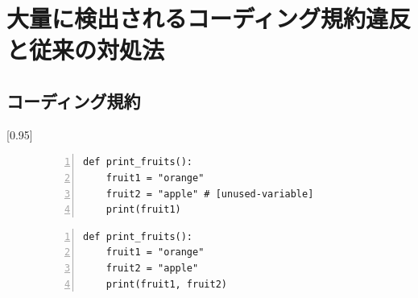 \documentclass[T,J]{fose} %
\begin{document}

\section{大量に検出されるコーディング規約違反と従来の対処法}\label{sec:background}

\subsection{コーディング規約}

\scalebox{0.95}[0.95] {

}
\begin{figure}[t]
\small
\vspace{-16pt}
    \begin{lstlisting}[caption={[upper/lower text]%
               \begin{tabular}[t]{@{}l@{}}
                problematic.py \\[1.0\normalbaselineskip]
               \end{tabular}},frame={tb},numbers=left,label=problematic,identifierstyle={\small}]
def print_fruits():
    fruit1 = "orange"
    fruit2 = "apple" # [unused-variable]
    print(fruit1)
\end{lstlisting}
\vspace{-13mm}
\end{figure}

\begin{figure}[t]
\small
    \begin{lstlisting}[caption={[upper/lower text]%
               \begin{tabular}[t]{@{}l@{}}
                correct.py \\[1.0\normalbaselineskip]
               \end{tabular}},frame={tb},numbers=left,label=correct,identifierstyle={\small}]
def print_fruits():
    fruit1 = "orange"
    fruit2 = "apple"
    print(fruit1, fruit2)
\end{lstlisting}
\vspace{-6mm}
\end{figure}
\end{document}
